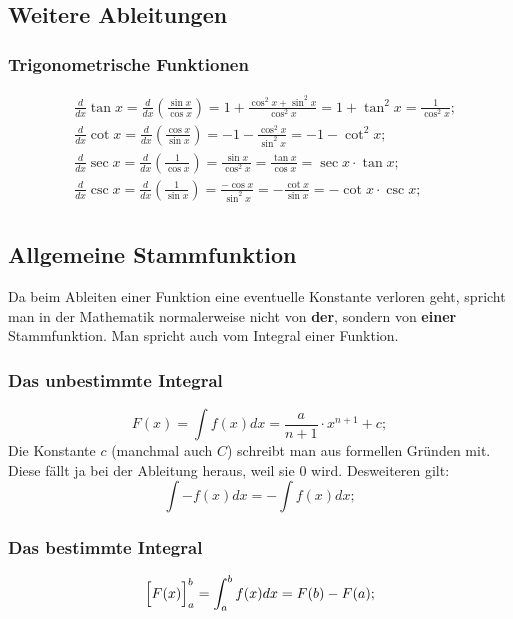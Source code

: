 \documentclass[a4paper]{article}
\begin{document}
\subsection{Weitere Ableitungen}

\subsubsection{Trigonometrische Funktionen}
\begin{align*}
	& \frac{d}{dx} \tan{x} = \frac{d}{dx} \left( \frac{\sin{x}}{\cos{x}} \right) = 1 + \frac{\cos^2{x} + \sin^2{x}}{\cos^2{x}} = 1 + \tan^2{x} = \frac{1}{\cos^2{x}};
	\\
	& \frac{d}{dx} \cot{x} = \frac{d}{dx} \left( \frac{\cos{x}}{\sin{x}} \right) = -1 - \frac{\cos^2{x}}{\sin^2{x}} = -1 - \cot^2{x};
	\\
	& \frac{d}{dx} \sec{x} = \frac{d}{dx} \left( \frac{1}{\cos{x}} \right) = \frac{\sin{x}}{\cos^2{x}} = \frac{\tan{x}}{\cos{x}} = \sec{x} \cdot \tan{x} ;
	\\
	& \frac{d}{dx} \csc{x} = \frac{d}{dx} \left( \frac{1}{\sin{x}} \right) = \frac{-\cos{x}}{\sin^2{x}} = -\frac{\cot{x}}{\sin{x}} = -\cot{x} \cdot \csc{x} ;
	\\
	&
\end{align*}

\subsection{Allgemeine Stammfunktion}
Da beim Ableiten einer Funktion eine eventuelle Konstante verloren geht, spricht man in der Mathematik normalerweise nicht von \textbf{der}, sondern von \textbf{einer} Stammfunktion. Man spricht auch vom Integral einer Funktion.

\subsubsection{Das unbestimmte Integral}
\[
	F(x) = \int f(x) dx = \frac{a}{n + 1} \cdot x ^ {n + 1} + c ;
\]
Die Konstante $c$ (manchmal auch $C$) schreibt man aus formellen Gründen mit. Diese fällt ja bei der Ableitung heraus, weil sie $0$ wird. Desweiteren gilt:
\[
	\int -f(x) dx = -\int f(x) dx ;
\]


\subsubsection{Das bestimmte Integral}
\[
	\Bigl[ F(x) \Bigr]_{a}^{b} = \int_{a}^{b} f(x) dx = F(b) - F(a) ;
\]
\end{document}
